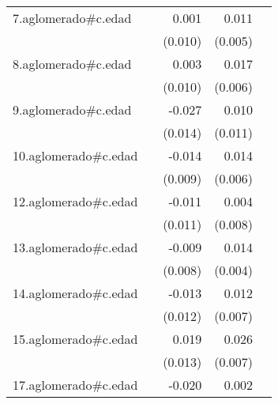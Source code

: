 {\begin{longtable}{l*{4}{D{.}{.}{-1}}}
\addlinespace
7.aglomerado#c.edad&                     &       0.001         &       0.011\sym{*}  &                     \\
            &                     &     (0.010)         &     (0.005)         &                     \\
\addlinespace
8.aglomerado#c.edad&                     &       0.003         &       0.017\sym{**} &                     \\
            &                     &     (0.010)         &     (0.006)         &                     \\
\addlinespace
9.aglomerado#c.edad&                     &      -0.027         &       0.010         &                     \\
            &                     &     (0.014)         &     (0.011)         &                     \\
\addlinespace
10.aglomerado#c.edad&                     &      -0.014         &       0.014\sym{*}  &                     \\
            &                     &     (0.009)         &     (0.006)         &                     \\
\addlinespace
12.aglomerado#c.edad&                     &      -0.011         &       0.004         &                     \\
            &                     &     (0.011)         &     (0.008)         &                     \\
\addlinespace
13.aglomerado#c.edad&                     &      -0.009         &       0.014\sym{***}&                     \\
            &                     &     (0.008)         &     (0.004)         &                     \\
\addlinespace
14.aglomerado#c.edad&                     &      -0.013         &       0.012         &                     \\
            &                     &     (0.012)         &     (0.007)         &                     \\
\addlinespace
15.aglomerado#c.edad&                     &       0.019         &       0.026\sym{***}&                     \\
            &                     &     (0.013)         &     (0.007)         &                     \\
\addlinespace
17.aglomerado#c.edad&                     &      -0.020         &       0.002         &                     \\

\end{longtable}}
